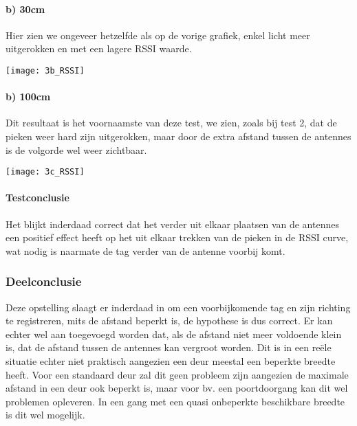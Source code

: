 \paragraph{b) 30cm}
\begin{minipage}{0.55\textwidth}
Hier zien we ongeveer hetzelfde als op de vorige grafiek, enkel licht meer uitgerokken en met een lagere RSSI waarde.
\end{minipage}
\hfill
\begin{minipage}{0.42\textwidth}
	\texttt{[image: 3b\_RSSI]}
\end{minipage}

\paragraph{b) 100cm}
\begin{minipage}{0.55\textwidth}
Dit resultaat is het voornaamste van deze test, we zien, zoals bij test 2, dat de pieken weer hard zijn uitgerokken, maar door de extra afstand tussen de antennes is de volgorde wel weer zichtbaar.
\end{minipage}
\hfill
\begin{minipage}{0.42\textwidth}
	\texttt{[image: 3c\_RSSI]}
\end{minipage}

\paragraph{Testconclusie}
Het blijkt inderdaad correct dat het verder uit elkaar plaatsen van de antennes een positief effect heeft op het uit elkaar trekken van de pieken in de RSSI curve, wat nodig is naarmate de tag verder van de antenne voorbij komt.

\subsubsection{Deelconclusie}
Deze opstelling slaagt er inderdaad in om een voorbijkomende tag en zijn richting te registreren, mits de afstand beperkt is, de hypothese is dus correct. Er kan echter wel aan toegevoegd worden dat, als de afstand niet meer voldoende klein is, dat de afstand tussen de antennes kan vergroot worden. Dit is in een reële situatie echter niet praktisch aangezien een deur meestal een beperkte breedte heeft. Voor een standaard deur zal dit geen probleem zijn aangezien de maximale afstand in een deur ook beperkt is, maar voor bv. een poortdoorgang kan dit wel problemen opleveren. In een gang met een quasi onbeperkte beschikbare breedte is dit wel mogelijk.

